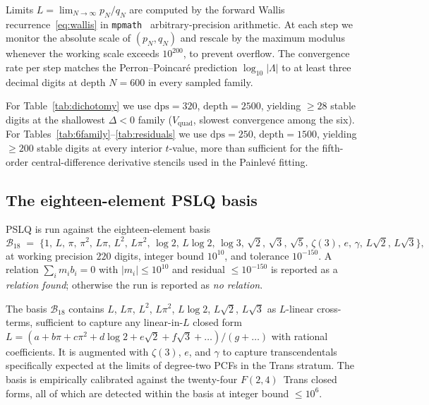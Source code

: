 \documentclass[11pt,reqno]{amsart}
\theoremstyle{definition}
\begin{document}
Limits $L = \lim_{N\to\infty} p_{N}/q_{N}$ are computed by the
forward Wallis recurrence~\eqref{eq:wallis} in
\texttt{mpmath}~\cite{mpmath} arbitrary-precision arithmetic.
At each step we monitor the absolute scale of
$(p_{N},q_{N})$ and rescale by the maximum modulus whenever
the working scale exceeds $10^{200}$, to prevent overflow.
The convergence rate per step matches the Perron--Poincar\'e
prediction $\log_{10}|\Lambda|$ to at least three decimal
digits at depth $N=600$ in every sampled family.

For Table~\ref{tab:dichotomy} we use $\mathrm{dps}=320$,
$\mathrm{depth}=2500$, yielding $\ge 28$ stable digits at the
shallowest $\Delta<0$ family ($V_{\mathrm{quad}}$, slowest
convergence among the six). For
Tables~\ref{tab:6family}--\ref{tab:residuals} we use
$\mathrm{dps}=250$, $\mathrm{depth}=1500$, yielding
$\ge 200$ stable digits at every interior $t$-value, more than
sufficient for the fifth-order central-difference derivative
stencils used in the Painlev\'e fitting.

\subsection{The eighteen-element PSLQ basis}\label{ssec:pslq}

PSLQ \cite{FergusonBailey1992} is run against the
eighteen-element basis
\begin{equation}\label{eq:pslq-basis}
\mathcal{B}_{18} \;=\;
\big\{1,\,L,\,\pi,\,\pi^{2},\,L\pi,\,L^{2},\,L\pi^{2},\,
\log 2,\,L\log 2,\,\log 3,\,
\sqrt{2},\,\sqrt{3},\,\sqrt{5},\,
\zeta(3),\,e,\,\gamma,\,L\sqrt{2},\,L\sqrt{3}\big\},
\end{equation}
at working precision $220$ digits, integer bound $10^{10}$,
and tolerance $10^{-150}$. A relation
$\sum_{i} m_{i} b_{i} = 0$ with $|m_{i}|\le 10^{10}$ and
residual $\le 10^{-150}$ is reported as a \emph{relation found};
otherwise the run is reported as \emph{no relation}.

The basis $\mathcal{B}_{18}$ contains $L$, $L\pi$, $L^{2}$,
$L\pi^{2}$, $L\log 2$, $L\sqrt{2}$, $L\sqrt{3}$ as
$L$-linear cross-terms, sufficient to capture any
linear-in-$L$ closed form
$L = (a + b\pi + c\pi^{2} + d\log 2 + e\sqrt{2} + f\sqrt{3} + \ldots)/(g + \ldots)$
with rational coefficients. It is augmented with
$\zeta(3)$, $e$, and $\gamma$ to capture transcendentals
specifically expected at the limits of degree-two PCFs in the
Trans stratum. The basis is empirically calibrated against
the twenty-four $F(2,4)$~Trans closed forms, all of which are
detected within the basis at integer bound $\le 10^{6}$.
\end{document}
